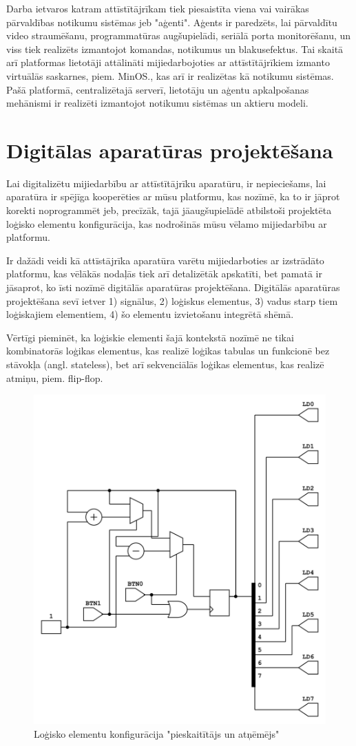 Darba ietvaros katram attīstītājrīkam tiek piesaistīta viena vai vairākas
pārvaldības notikumu sistēmas jeb "aģenti". Aģents ir paredzēts, lai pārvaldītu
video straumēšanu, programmatūras augšupielādi, seriālā porta monitorēšanu, un
viss tiek realizēts izmantojot komandas, notikumus un blakusefektus. Tai skaitā
arī platformas lietotāji attālināti mijiedarbojoties ar attīstītājrīkiem izmanto
virtuālās saskarnes, piem. MinOS., kas arī ir realizētas kā notikumu sistēmas.
Pašā platformā, centralizētajā serverī, lietotāju un aģentu apkalpošanas
mehānismi ir realizēti izmantojot notikumu sistēmas un aktieru modeli. 

\section{Digitālas aparatūras projektēšana}

Lai digitalizētu mijiedarbību ar attīstītājrīku aparatūru, ir nepieciešams, lai
aparatūra ir spējīga kooperēties ar mūsu platformu, kas nozīmē, ka to ir jāprot
korekti noprogrammēt jeb, precīzāk, tajā jāaugšupielādē atbilstoši projektēta
loģisko elementu konfigurācija, kas nodrošinās mūsu vēlamo mijiedarbību ar
platformu.

Ir dažādi veidi kā attīstājrīka aparatūra varētu mijiedarboties ar izstrādāto
platformu, kas vēlākās nodaļās tiek arī detalizētāk apskatīti, bet pamatā ir
jāsaprot, ko īsti nozīmē digitālās aparatūras projektēšana. Digitālās aparatūras
projektēšana sevī ietver 1) signālus, 2) loģiskus elementus, 3) vadus starp tiem
loģiskajiem elementiem, 4) šo elementu izvietošanu integrētā shēmā. 

Vērtīgi pieminēt, ka loģiskie elementi šajā kontekstā nozīmē ne tikai
kombinatorās loģikas elementus, kas realizē loģikas tabulas un funkcionē bez
stāvokļa (angl. stateless), bet arī sekvenciālās loģikas elementus, kas realizē
atmiņu, piem. flip-flop. \cite[para 1.1]{LarryMassengale2018} 

\begin{figure}[H]
    \includegraphics[width=0.5\linewidth]{assets/counter.png}
    \centering
    \caption{Loģisko elementu konfigurācija "pieskaitītājs un atņēmējs"}
    \label{fig:counter}
\end{figure}


